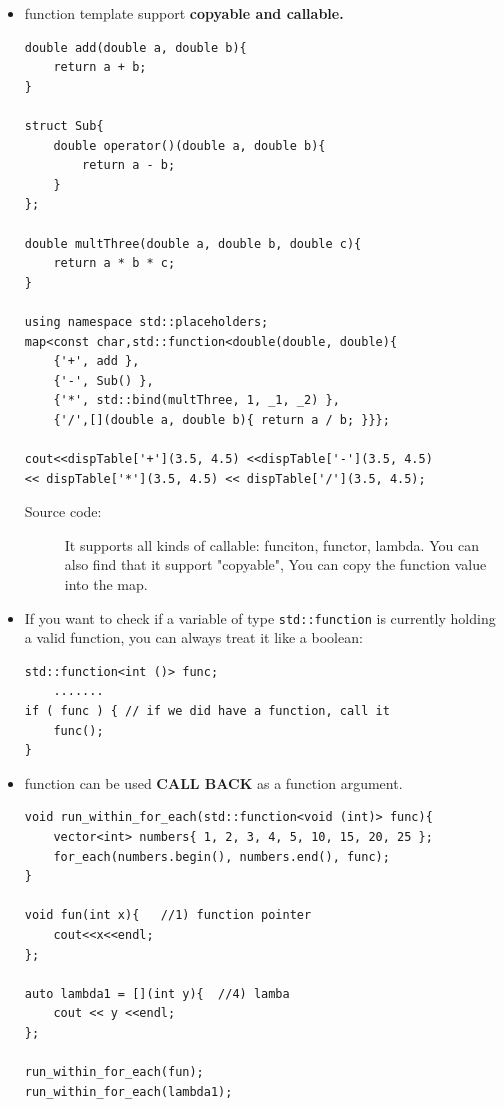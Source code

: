 \documentclass[a4paper,11pt,twoside]{book}
\begin{document}
\begin{itemize}
	\item function template support \textbf{copyable and callable.}
\begin{lstlisting}[numbers=none]
double add(double a, double b){
	return a + b;
}
	
struct Sub{
	double operator()(double a, double b){
		return a - b;
	}
};
	
double multThree(double a, double b, double c){
	return a * b * c;
}
	
using namespace std::placeholders;
map<const char,std::function<double(double, double){
	{'+', add },                                         
	{'-', Sub() },                                      
	{'*', std::bind(multThree, 1, _1, _2) },             
	{'/',[](double a, double b){ return a / b; }}};      
	
cout<<dispTable['+'](3.5, 4.5) <<dispTable['-'](3.5, 4.5) 
<< dispTable['*'](3.5, 4.5) << dispTable['/'](3.5, 4.5);
\end{lstlisting}
	\begin{description}
		\item[Source code:] It supports all kinds of callable: funciton, functor, lambda. You can also find that it support "copyable", You can copy the function value into the map. 
	\end{description}
	
	\item If you want to check if a variable of type \texttt{std::function} is currently holding a valid function, you can always treat it like a boolean:
\begin{lstlisting}[numbers=none]
std::function<int ()> func;
	.......
if ( func ) { // if we did have a function, call it
	func();
}
\end{lstlisting}
	
	\item function can be used \textbf{CALL BACK} as a function argument. 
	
\begin{lstlisting}[numbers=none]
void run_within_for_each(std::function<void (int)> func){
	vector<int> numbers{ 1, 2, 3, 4, 5, 10, 15, 20, 25 };
	for_each(numbers.begin(), numbers.end(), func);
}
	
void fun(int x){   //1) function pointer
	cout<<x<<endl;
};
	
auto lambda1 = [](int y){  //4) lamba
	cout << y <<endl;
};
	
run_within_for_each(fun);
run_within_for_each(lambda1);
\end{lstlisting}
	

\end{itemize}
\end{document}
